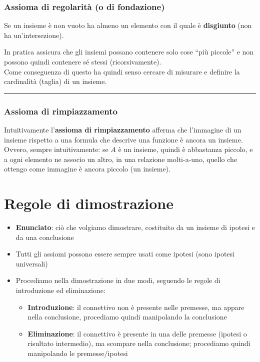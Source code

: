 \documentclass[
  a4paper,
]{article}
\providecommand{\tightlist}{%
  \setlength{\itemsep}{0pt}\setlength{\parskip}{0pt}}
\begin{document}
\hypertarget{assioma-di-regolarituxe0-o-di-fondazione}{%
\subsubsection{Assioma di regolarità (o di
fondazione)}\label{assioma-di-regolarituxe0-o-di-fondazione}}

Se un insieme è non vuoto ha almeno un elemento con il quale è
\textbf{disgiunto} (non ha un'intersezione).

In pratica assicura che gli insiemi possano contenere solo cose ``più
piccole'' e non possono quindi contenere sé stessi (ricorsivamente).\\
Come conseguenza di questo ha quindi senso cercare di misurare e
definire la cardinalità (taglia) di un insieme.

\par\noindent\rule{\linewidth}{0.4pt}\par\vspace{6pt}

\hypertarget{assioma-di-rimpiazzamento}{%
\subsubsection{Assioma di
rimpiazzamento}\label{assioma-di-rimpiazzamento}}

Intuitivamente l'\textbf{assioma di rimpiazzamento} afferma che
l'immagine di un insieme rispetto a una formula che descrive una
funzione è ancora un insieme.\\
Ovvero, sempre intuitivamente: se \(A\) è un insieme, quindi è
abbastanza piccolo, e a ogni elemento ne associo un altro, in una
relazione molti-a-uno, quello che ottengo come immagine è ancora piccolo
(un insieme).

\newpage

\hypertarget{regole-di-dimostrazione}{%
\section{Regole di dimostrazione}\label{regole-di-dimostrazione}}

\begin{itemize}
\item
  \textbf{Enunciato}: ciò che volgiamo dimostrare, costituito da un
  insieme di ipotesi e da una conclusione
\item
  Tutti gli assiomi possono essere sempre usati come ipotesi (sono
  ipotesi universali)
\item
  Procediamo nella dimostrazione in due modi, seguendo le regole di
  introduzione ed eliminazione:

  \begin{itemize}
  \tightlist
  \item
    \textbf{Introduzione}: il connettivo non è presente nelle premesse,
    ma appare nella conclusione, procediamo quindi manipolando la
    conclusione
  \item
    \textbf{Eliminazione}: il connettivo è presente in una delle
    premesse (ipotesi o risultato intermedio), ma scompare nella
    conclusione; procediamo quindi manipolando le premesse/ipotesi
  \end{itemize}
\end{itemize}
\end{document}

